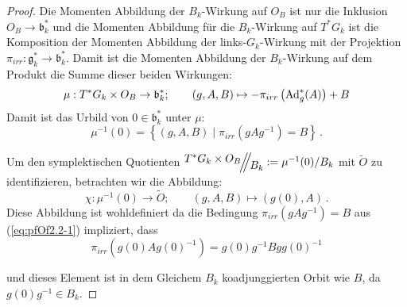 \begin{proof}
Die Momenten Abbildung der $B_k$-Wirkung auf $O_B$ ist nur die Inklusion
$O_B\to\mathfrak b_k^*$ und die Momenten Abbildung für die $B_k$-Wirkung auf
$T^*G_k$ ist die Komposition der Momenten Abbildung der links-$G_k$-Wirkung mit
der Projektion $\pi_{irr}:\mathfrak g_k^*\to\mathfrak b_k^*$. 
Damit ist die Momenten Abbildung der $B_k$-Wirkung auf dem Produkt die Summe
dieser beiden Wirkungen:
\begin{equation}\label{eq:pfOf2.2-1}
\mu:T^*G_k\times O_B\to \mathfrak b_k^*;\qquad (g,A,B)\mapsto
  -\pi_{irr}\left(\operatorname{Ad}_g^*(A)\right)+B
\end{equation}
Damit ist das Urbild von $0\in\mathfrak b_k^*$ unter $\mu$:
\[
\mu^{-1}(0)=\left\{(g,A,B)\mid\pi_{irr}(gAg^{-1})=B\right\} \,.
\]
\begin{comment}
Sei $(g,A,B)\in T^*G_k\times O_B$ im Kern, also
\begin{align*}
0=\mu((g,A,B))&=-\pi_{irr}\left(\Ad_g^*(A)\right)+B
\\&=-\pi_{irr}\left(gAg^{-1}\right)+B \qquad \text{also} \qquad
    \pi_{irr}\left(gAg^{-1}\right)=B
\end{align*}
\end{comment}
Um den symplektischen Quotienten
$\symplquot{T^*G_k\times O_B}{B_k}:=\mu^{-1}(0)/B_k$
mit $\tilde O$ zu identifizieren, betrachten wir die Abbildung:
\[
\chi:\mu^{-1}(0)\to\tilde O;\qquad(g,A,B)\mapsto(g(0),A)\,.
\]
Diese Abbildung ist wohldefiniert da die Bedingung $\pi_{irr}(gAg^{-1})=B$ aus
(\ref{eq:pfOf2.2-1}) impliziert, dass
\[
\pi_{irr}(g(0)Ag(0)^{-1})=g(0)g^{-1}Bgg(0)^{-1}
\]
\begin{comment}
\begin{align*}
\pi_{irr}(g(0)Ag(0)^{-1})
  &=g(0)\pi_{irr}(A)g(0)^{-1}
\\&=g(0)\pi_{irr}(g^{-1}gAg^{-1}g)g(0)^{-1}
\\&\overset{\text{\color{red}?}}=g(0)g^{-1}\pi_{irr}(gAg^{-1})gg(0)^{-1}
\\&=g(0)g^{-1}Bgg(0)^{-1}
\end{align*}
\end{comment}
und dieses Element ist in dem Gleichem $B_k$ koadjunggierten Orbit wie $B$, da
$g(0)g^{-1}\in B_k$.
\begin{comment}
\begin{align*}
g(0)g^{-1}
  &=g(0)\left(g(0)+g_i\xi^1+\dots+g_k\xi^k\right)^{-1}
\\&\overset{\text{\color{red}?}}=
    g(0)\left(g(0)^{-1}+(g_i)^{-1}\xi^1+\dots+(g_k)^{-1}\xi^k\right)

\end{comment}
\end{proof}
